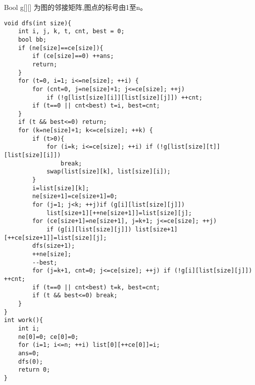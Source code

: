 Bool g[][] 为图的邻接矩阵,图点的标号由1至n。\\
\begin{lstlisting}
void dfs(int size){
	int i, j, k, t, cnt, best = 0;
	bool bb;
	if (ne[size]==ce[size]){
		if (ce[size]==0) ++ans;
		return;
	}
	for (t=0, i=1; i<=ne[size]; ++i) {
		for (cnt=0, j=ne[size]+1; j<=ce[size]; ++j)
			if (!g[list[size][i]][list[size][j]]) ++cnt;
		if (t==0 || cnt<best) t=i, best=cnt;
	}
	if (t && best<=0) return;
	for (k=ne[size]+1; k<=ce[size]; ++k) {
		if (t>0){
			for (i=k; i<=ce[size]; ++i) if (!g[list[size][t]][list[size][i]])
				break;
			swap(list[size][k], list[size][i]);
		}
		i=list[size][k];
		ne[size+1]=ce[size+1]=0;
		for (j=1; j<k; ++j)if (g[i][list[size][j]])
			list[size+1][++ne[size+1]]=list[size][j];
		for (ce[size+1]=ne[size+1], j=k+1; j<=ce[size]; ++j)
			if (g[i][list[size][j]]) list[size+1][++ce[size+1]]=list[size][j];
		dfs(size+1);
		++ne[size];
		--best;
		for (j=k+1, cnt=0; j<=ce[size]; ++j) if (!g[i][list[size][j]]) ++cnt;
		if (t==0 || cnt<best) t=k, best=cnt;
		if (t && best<=0) break;
	}
}
int work(){
	int i;
	ne[0]=0; ce[0]=0;
	for (i=1; i<=n; ++i) list[0][++ce[0]]=i;
	ans=0;
	dfs(0);
	return 0;
}
\end{lstlisting}
